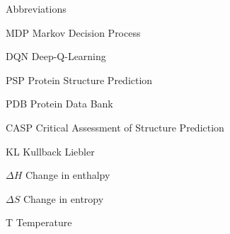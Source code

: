 
\begin{dictionary}{Abbreviations}
\item[MDP]  Markov Decision Process
\item[DQN]  Deep-Q-Learning
\item[PSP]  Protein Structure Prediction
\item[PDB]  Protein Data Bank
\item[CASP] Critical Assessment of Structure Prediction
\item[KL]   Kullback Liebler
\item[$\Delta H$] Change in enthalpy
\item[$\Delta S$] Change in entropy
\item[T] Temperature
\end{dictionary}
